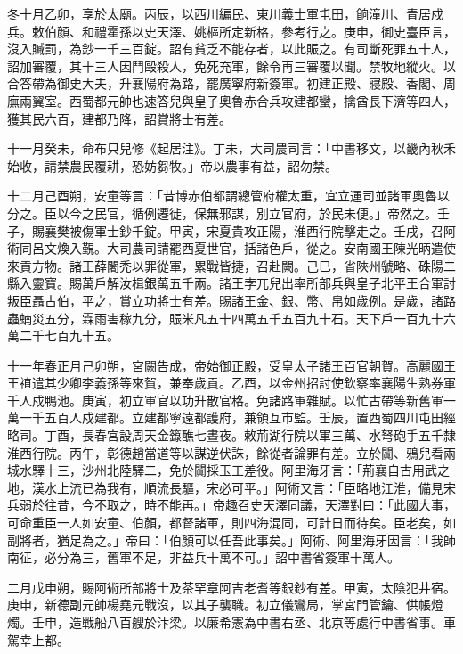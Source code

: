 \begin{pinyinscope}
 冬十月乙卯，享於太廟。丙辰，以西川編民、東川義士軍屯田，餉潼川、青居戍兵。敕伯顏、和禮霍孫以史天澤、姚樞所定新格，參考行之。庚申，御史臺臣言，沒入贓罰，為鈔一千三百錠。詔有貧乏不能存者，以此賑之。有司斷死罪五十人，詔加審覆，其十三人因鬥毆殺人，免死充軍，餘令再三審覆以聞。禁牧地縱火。以合答帶為御史大夫，升襄陽府為路，罷廣寧府新簽軍。初建正殿、寢殿、香閣、周廡兩翼室。西蜀都元帥也速答兒與皇子奧魯赤合兵攻建都蠻，擒酋長下濟等四人，獲其民六百，建都乃降，詔賞將士有差。



 十一月癸未，命布只兒修《起居注》。丁未，大司農司言：「中書移文，以畿內秋禾始收，請禁農民覆耕，恐妨芻牧。」帝以農事有益，詔勿禁。



 十二月己酉朔，安童等言：「昔博赤伯都謂總管府權太重，宜立運司並諸軍奧魯以分之。臣以今之民官，循例遷徙，保無邪謀，別立官府，於民未便。」帝然之。壬子，賜襄樊被傷軍士鈔千錠。甲寅，宋夏貴攻正陽，淮西行院擊走之。壬戌，召阿術同呂文煥入覲。大司農司請罷西夏世官，括諸色戶，從之。安南國王陳光昞遣使來貢方物。諸王薛闍禿以罪從軍，累戰皆捷，召赴闕。己巳，省陜州虢略、硃陽二縣入靈寶。賜萬戶解汝楫銀萬五千兩。諸王孛兀兒出率所部兵與皇子北平王合軍討叛臣聶古伯，平之，賞立功將士有差。賜諸王金、銀、幣、帛如歲例。是歲，諸路蟲蝻災五分，霖雨害稼九分，賑米凡五十四萬五千五百九十石。天下戶一百九十六萬二千七百九十五。



 十一年春正月己卯朔，宮闕告成，帝始御正殿，受皇太子諸王百官朝賀。高麗國王王禃遣其少卿李義孫等來賀，兼奉歲貢。乙酉，以金州招討使欽察率襄陽生熟券軍千人戍鴨池。庚寅，初立軍官以功升散官格。免諸路軍雜賦。以忙古帶等新舊軍一萬一千五百人戍建都。立建都寧遠都護府，兼領互市監。壬辰，置西蜀四川屯田經略司。丁酉，長春宮設周天金籙醮七晝夜。敕荊湖行院以軍三萬、水弩砲手五千隸淮西行院。丙午，彰德趙當道等以謀逆伏誅，餘從者論罪有差。立於闐、鴉兒看兩城水驛十三，沙州北陸驛二，免於闐採玉工差役。阿里海牙言：「荊襄自古用武之地，漢水上流已為我有，順流長驅，宋必可平。」阿術又言：「臣略地江淮，備見宋兵弱於往昔，今不取之，時不能再。」帝趣召史天澤同議，天澤對曰：「此國大事，可命重臣一人如安童、伯顏，都督諸軍，則四海混同，可計日而待矣。臣老矣，如副將者，猶足為之。」帝曰：「伯顏可以任吾此事矣。」阿術、阿里海牙因言：「我師南征，必分為三，舊軍不足，非益兵十萬不可。」詔中書省簽軍十萬人。



 二月戊申朔，賜阿術所部將士及茶罕章阿吉老耆等銀鈔有差。甲寅，太陰犯井宿。庚申，新德副元帥楊堯元戰沒，以其子襲職。初立儀鸞局，掌宮門管鑰、供帳燈燭。壬申，造戰船八百艘於汴梁。以廉希憲為中書右丞、北京等處行中書省事。車駕幸上都。




\end{pinyinscope}
